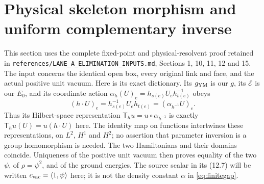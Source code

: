 \section{Physical skeleton morphism and uniform complementary inverse}
\label{sec:uniforminverse}

This section uses the complete fixed-point and physical-resolvent proof
retained in \nolinkurl{references/LANE_A_ELIMINATION_INPUTS.md},
Sections 1, 10, 11, 12 and 15. The input concerns the identical open
box, every original link and face, and the actual positive unit vacuum.
Here is its exact dictionary. Its $g_{\rm YM}$ is our $g$, its
$\mathcal E$ is our $E_0$, and its coordinate action
$\alpha_h(U)_e=h_{s(e)}U_eh_{t(e)}^{-1}$ obeys
\[
 (h\cdot U)_e=h_{s(e)}^{-1}U_eh_{t(e)}
                  =(\alpha_{h^{-1}}U)_e.
\]
Thus its Hilbert-space representation
$\mathsf T_hu=u\circ\alpha_{h^{-1}}$ is exactly
$\mathsf T_hu(U)=u(h\cdot U)$ here. The identity map on functions
intertwines these representations, on $L^2$, $H^1$ and $H^2$;
no assertion that parameter inversion is a group homomorphism is needed.
The two Hamiltonians and their domains coincide. Uniqueness of the
positive unit vacuum then proves equality of the two $\psi$, of
$\rho=\psi^2$, and of the ground energies. The source scalar in its
(12.7) will be written $c_{\rm vac}=\langle1,\psi\rangle$ here;
it is not the density constant $\alpha$ in \eqref{eq:finitegap}.

